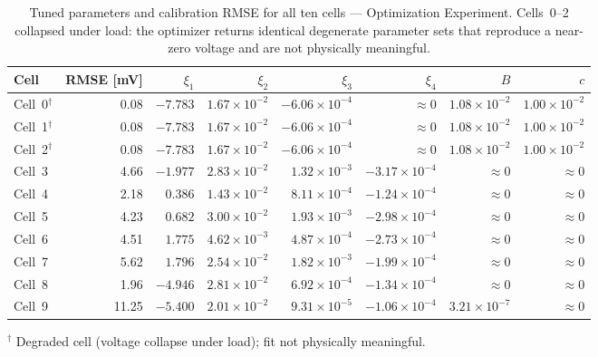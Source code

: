 \documentclass[11pt,a4paper]{article}
\begin{document}
\begin{table}[H]
    \centering
    \caption{Tuned parameters and calibration RMSE for all ten cells ---
             Optimization Experiment. Cells~0--2 collapsed under load: the
             optimizer returns identical degenerate parameter sets that
             reproduce a near-zero voltage and are not physically meaningful.}
    \label{tab:params-opt}
    \small
    \begin{tabular}{lrrrrrrr}
        \toprule
        Cell & RMSE [mV] & $\xi_1$ & $\xi_2$ & $\xi_3$ & $\xi_4$ & $B$ & $c$ \\
        \midrule
        Cell~0$^{\dagger}$ & 0.08 & $-7.783$ & $1.67\!\times\!10^{-2}$ & $-6.06\!\times\!10^{-4}$ & $\approx 0$ & $1.08\!\times\!10^{-2}$ & $1.00\!\times\!10^{-2}$ \\
        Cell~1$^{\dagger}$ & 0.08 & $-7.783$ & $1.67\!\times\!10^{-2}$ & $-6.06\!\times\!10^{-4}$ & $\approx 0$ & $1.08\!\times\!10^{-2}$ & $1.00\!\times\!10^{-2}$ \\
        Cell~2$^{\dagger}$ & 0.08 & $-7.783$ & $1.67\!\times\!10^{-2}$ & $-6.06\!\times\!10^{-4}$ & $\approx 0$ & $1.08\!\times\!10^{-2}$ & $1.00\!\times\!10^{-2}$ \\
        Cell~3 &  4.66 & $-1.977$ & $2.83\!\times\!10^{-2}$ & $1.32\!\times\!10^{-3}$  & $-3.17\!\times\!10^{-4}$ & $\approx 0$ & $\approx 0$ \\
        Cell~4 &  2.18 & $ 0.386$ & $1.43\!\times\!10^{-2}$ & $8.11\!\times\!10^{-4}$  & $-1.24\!\times\!10^{-4}$ & $\approx 0$ & $\approx 0$ \\
        Cell~5 &  4.23 & $ 0.682$ & $3.00\!\times\!10^{-2}$ & $1.93\!\times\!10^{-3}$  & $-2.98\!\times\!10^{-4}$ & $\approx 0$ & $\approx 0$ \\
        Cell~6 &  4.51 & $ 1.775$ & $4.62\!\times\!10^{-3}$ & $4.87\!\times\!10^{-4}$  & $-2.73\!\times\!10^{-4}$ & $\approx 0$ & $\approx 0$ \\
        Cell~7 &  5.62 & $ 1.796$ & $2.54\!\times\!10^{-2}$ & $1.82\!\times\!10^{-3}$  & $-1.99\!\times\!10^{-4}$ & $\approx 0$ & $\approx 0$ \\
        Cell~8 &  1.96 & $-4.946$ & $2.81\!\times\!10^{-2}$ & $6.92\!\times\!10^{-4}$  & $-1.34\!\times\!10^{-4}$ & $\approx 0$ & $\approx 0$ \\
        Cell~9 & 11.25 & $-5.400$ & $2.01\!\times\!10^{-2}$ & $9.31\!\times\!10^{-5}$  & $-1.06\!\times\!10^{-4}$ & $3.21\!\times\!10^{-7}$ & $\approx 0$ \\
        \bottomrule
    \end{tabular}

    \medskip
    \footnotesize $^{\dagger}$ Degraded cell (voltage collapse under load); fit not physically meaningful.
\end{table}
\end{document}
